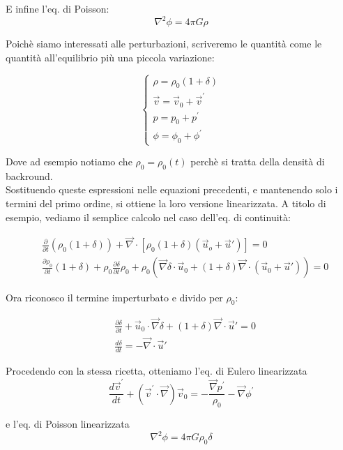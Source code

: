 \documentclass{report}
\begin{document}
E infine l'eq. di Poisson: 
\begin{equation}
    \nabla^2\phi = 4\pi G \rho
\end{equation}

Poichè siamo interessati alle perturbazioni, scriveremo le quantità come le quantità all'equilibrio più una piccola variazione: 

\[\begin{cases}
    \rho = \rho_0(1+\delta) \\
    \vec{v} = \vec{v}_0 + \vec{v}^{'}\\
    p = p_0 + p^{'}\\
    \phi = \phi_0 + \phi^{'}
\end{cases}\]

Dove ad esempio notiamo che $\rho_0 = \rho_0(t)$ perchè si tratta della densità di backround. \\
Sostituendo queste espressioni nelle equazioni precedenti, e mantenendo solo i termini del primo ordine, si ottiene la loro versione linearizzata. A titolo di esempio, vediamo il semplice calcolo nel caso dell'eq. di continuità: 

\begin{align}
    &\frac{\partial}{\partial t}\left(\rho_0(1+\delta)\right) + \vec{\nabla}\cdot [\rho_0(1+\delta)(\vec{u}_o + \vec{u}')] =0 \\
    & \frac{\partial \rho_0}{\partial t}(1+\delta) + \rho_0 \frac{\partial \delta}{\partial t}\rho_0 + \rho_0(\vec{\nabla}\delta \cdot \vec{u}_0 + (1+\delta)\vec{\nabla}\cdot(\vec{u}_0 + \vec{u}')) =0
\end{align}

Ora riconosco il termine imperturbato e divido per \(\rho_0\): 

\begin{align}
    &\frac{\partial \delta}{\partial t} + \vec{u}_0 \cdot \vec{\nabla}\delta + (1+\delta)\vec{\nabla}\cdot \vec{u}' =0 \\
    & \frac{d\delta}{dt} = -\vec{\nabla}\cdot \vec{u}'
\end{align}


Procedendo con la stessa ricetta, otteniamo l'eq. di Eulero linearizzata
\begin{equation}
    \frac{d\vec{v}^{'}}{dt} + (\vec{v}^{'}\cdot \vec{\nabla})\vec{v}_0 = -\frac{\vec{\nabla}p^{'}}{\rho_0} - \vec{\nabla}\phi^{'}
\end{equation}

e l'eq. di Poisson linearizzata
\begin{equation}
    \nabla^2\phi = 4\pi G\rho_0 \delta
\end{equation}
\end{document}
